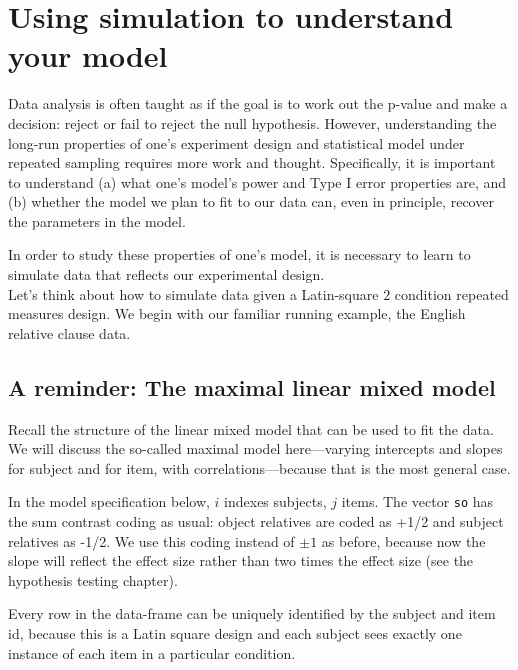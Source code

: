 \documentclass[12pt,]{krantz}
\begin{document}
\hypertarget{using-simulation-to-understand-your-model}{%
\chapter{Using simulation to understand your model}\label{using-simulation-to-understand-your-model}}

Data analysis is often taught as if the goal is to work out the p-value and make a decision: reject or fail to reject the null hypothesis. However, understanding the long-run properties of one's experiment design and statistical model under repeated sampling requires more work and thought. Specifically, it is important to understand (a) what one's model's power and Type I error properties are, and (b) whether the model we plan to fit to our data can, even in principle, recover the parameters in the model.

In order to study these properties of one's model, it is necessary to learn to simulate data that reflects our experimental design.\\
Let's think about how to simulate data given a Latin-square \(2\) condition repeated measures design. We begin with our familiar running example, the \citet{grodner} English relative clause data.

\hypertarget{a-reminder-the-maximal-linear-mixed-model}{%
\section{A reminder: The maximal linear mixed model}\label{a-reminder-the-maximal-linear-mixed-model}}

Recall the structure of the linear mixed model that can be used to fit the \citet{grodner} data. We will discuss the so-called maximal model here---varying intercepts and slopes for subject and for item, with correlations---because that is the most general case.

In the model specification below, \(i\) indexes subjects, \(j\) items. The vector \texttt{so} has the sum contrast coding as usual: object relatives are coded as +1/2 and subject relatives as -1/2. We use this coding instead of \(\pm 1\) as before, because now the slope will reflect the effect size rather than two times the effect size (see the hypothesis testing chapter).

Every row in the data-frame can be uniquely identified by the subject and item id, because this is a Latin square design and each subject sees exactly one instance of each item in a particular condition.
\end{document}
